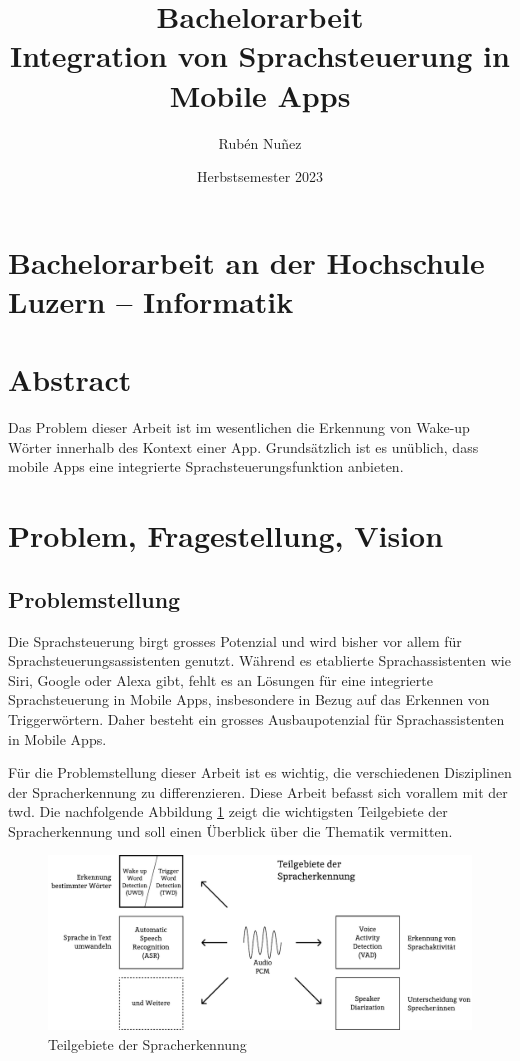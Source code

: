 \documentclass[11pt,a4paper]{article}
\title{
{\LARGE Bachelorarbeit}\\[2em]
{\textbf{Integration von Sprachsteuerung {\break} in Mobile Apps}}
}
\author{Rubén Nuñez}
\date{Herbstsemester 2023}
\begin{document}
\maketitle
\thispagestyle{empty} %
\newpage

\section*{Bachelorarbeit an der Hochschule Luzern -- Informatik}

\newpage

\newpage \section*{Abstract}
Das Problem dieser Arbeit ist im wesentlichen die Erkennung von Wake-up Wörter innerhalb
des Kontext einer App. Grundsätzlich ist es unüblich, dass mobile Apps eine
integrierte Sprachsteuerungsfunktion anbieten.


\newpage
\tableofcontents

\newpage

\newpage \section{Problem, Fragestellung, Vision}
\subsection{Problemstellung}
Die Sprachsteuerung birgt grosses Potenzial und wird bisher vor allem für
Sprachsteuerungsassistenten genutzt. Während es etablierte Sprachassistenten wie Siri, Google
oder Alexa gibt, fehlt es an Lösungen für eine integrierte Sprachsteuerung in Mobile Apps,
insbesondere in Bezug auf das Erkennen von Triggerwörtern. Daher besteht ein grosses 
Ausbaupotenzial für Sprachassistenten in Mobile Apps. 

\noindent \newline
Für die Problemstellung dieser Arbeit ist es wichtig, die verschiedenen Disziplinen der
Spracherkennung zu differenzieren. Diese Arbeit befasst sich vorallem mit der \gls{twd}. Die 
nachfolgende Abbildung \ref{fig:asr_twd} zeigt die wichtigsten Teilgebiete der Spracherkennung und 
soll einen Überblick über die Thematik vermitten. 

\vspace{1em}
\begin{figure}[h]
	\centering
	\includegraphics[width=0.8\linewidth]{img/asr_twd.pdf}
	\caption{Teilgebiete der Spracherkennung}
	\label{fig:asr_twd}

\end{figure}
\end{document}
